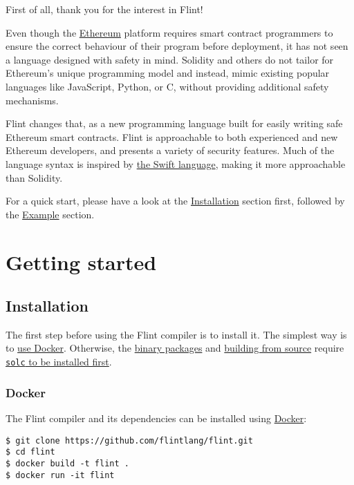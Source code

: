 First of all, thank you for the interest in Flint!

Even though the \href{https://www.ethereum.org/}{Ethereum} platform requires smart contract programmers to ensure the correct behaviour of their program before deployment, it has not seen a language designed with safety in mind. Solidity and others do not tailor for Ethereum’s unique programming model and instead, mimic existing popular languages like JavaScript, Python, or C, without providing additional safety mechanisms.

Flint changes that, as a new programming language built for easily writing safe Ethereum smart contracts. Flint is approachable to both experienced and new Ethereum developers, and presents a variety of security features. Much of the language syntax is inspired by \href{https://swift.org/}{the Swift language}, making it more approachable than Solidity.

For a quick start, please have a look at the \hyperref[sec:appendix-b-installation]{Installation} section first, followed by the \hyperref[sec:appendix-b-example]{Example} section.

\section{Getting started}
\label{sec:appendix-b-getting-started}

\subsection{Installation}
\label{sec:appendix-b-installation}

The first step before using the Flint compiler is to install it. The simplest way is to \hyperref[sec:appendix-b-docker]{use Docker}. Otherwise, the \hyperref[sec:appendix-b-binary-packages]{binary packages} and \hyperref[sec:appendix-b-building-from-source]{building from source} require \hyperref[sec:appendix-b-installing-solc-the-solidity-compiler]{\texttt{solc} to be installed first}.

\subsubsection{Docker}
\label{sec:appendix-b-docker}

The Flint compiler and its dependencies can be installed using \href{https://www.docker.com/}{Docker}:

\begin{verbatim}
$ git clone https://github.com/flintlang/flint.git
$ cd flint
$ docker build -t flint .
$ docker run -it flint
\end{verbatim}

